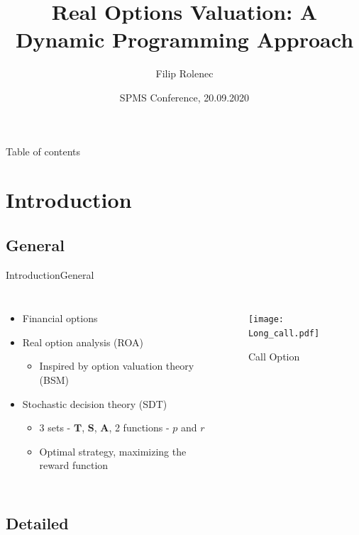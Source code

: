 \documentclass[us]{beamer}
\title{Real Options Valuation: A Dynamic Programming Approach}
\author{Filip Rolenec}
\institute[CTU-FNSPE] %
{
  \inst{}%
  Czech technical university in Prague\\
  FNSPE \\
  Department of Mathematics
 
}
\date{SPMS Conference, 20.09.2020}
\begin{document}
\begin{frame}
  \titlepage
\end{frame}

\begin{frame}{Table of contents}
  \tableofcontents
\end{frame}


\section{Introduction}

\subsection{General}

\begin{frame}{Introduction}{General}

	\begin{columns}
 		\begin{itemize}
 			\item {Financial options}
			\item {Real option analysis (ROA)}
			\begin{itemize}
				\item{Inspired by option valuation theory (BSM)} 
			\end{itemize}
			\item {Stochastic decision theory (SDT)}
			\begin{itemize}
				\item {3 sets - $\mathbf{T}$, $\mathbf{S}$, $\mathbf{A}$, 2 functions - $p$ and $r$}
				\item {Optimal strategy, maximizing the reward function}
			\end{itemize}
		\end{itemize}	
		\begin{figure}
			\texttt{[image: Long\_call.pdf]}
			\caption{Call Option \cite{Inv:20}}
		\end{figure}
\end{columns}	

\end{frame}

\subsection{Detailed}
\end{document}
